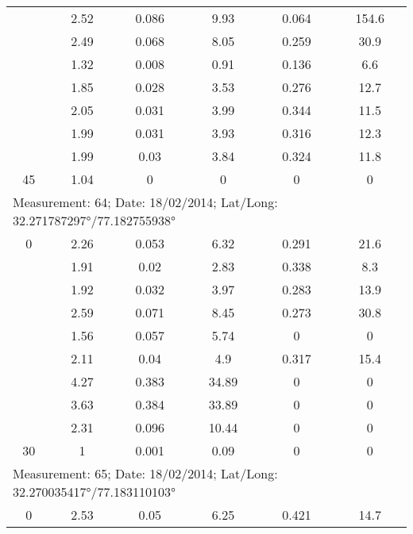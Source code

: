 \begin{longtable}{cccccc}
		& 2.52  & 0.086 & 9.93  & 0.064 & 154.6 \\
		
		& 2.49  & 0.068 & 8.05  & 0.259 & 30.9 \\
		
		& 1.32  & 0.008 & 0.91  & 0.136 & 6.6 \\
		
		& 1.85  & 0.028 & 3.53  & 0.276 & 12.7 \\
		
		& 2.05  & 0.031 & 3.99  & 0.344 & 11.5 \\
		
		& 1.99  & 0.031 & 3.93  & 0.316 & 12.3 \\
		
		& 1.99  & 0.03  & 3.84  & 0.324 & 11.8 \\
		
		45    & 1.04  & 0     & 0     & 0     & 0 \\
		\midrule
		\multicolumn{6}{l}{Measurement: 64; Date: 18/02/2014;
			Lat/Long: 32.271787297°/77.182755938°} \\		
		\midrule
		0     & 2.26  & 0.053 & 6.32  & 0.291 & 21.6 \\
		
		& 1.91  & 0.02  & 2.83  & 0.338 & 8.3 \\
		
		& 1.92  & 0.032 & 3.97  & 0.283 & 13.9 \\
		
		& 2.59  & 0.071 & 8.45  & 0.273 & 30.8 \\
		
		& 1.56  & 0.057 & 5.74  & 0     & 0 \\
		
		& 2.11  & 0.04  & 4.9   & 0.317 & 15.4 \\
		
		& 4.27  & 0.383 & 34.89 & 0     & 0 \\
		
		& 3.63  & 0.384 & 33.89 & 0     & 0 \\
		
		& 2.31  & 0.096 & 10.44 & 0     & 0 \\
		
		30    & 1     & 0.001 & 0.09  & 0     & 0 \\
		\midrule
		\multicolumn{6}{l}{Measurement: 65; Date: 18/02/2014;
			Lat/Long: 32.270035417°/77.183110103°} \\		
		\midrule
		0     & 2.53  & 0.05  & 6.25  & 0.421 & 14.7 \\
		

\end{longtable}
